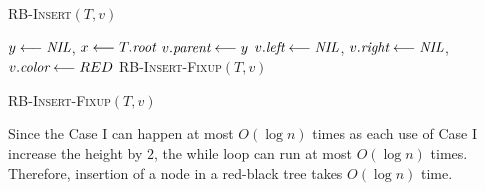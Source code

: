 \begin{minipage}{0.46\textwidth}
	\begin{algorithm}[H]
		\caption{\textsc{RB-Insert}$(T,v)$}
		\DontPrintSemicolon
		$y\longleftarrow \emph{NIL}$, $x\longleftarrow T.\emph{root}$\;
		$v.\emph{parent}\longleftarrow y$\;
		$v.\emph{left}\longleftarrow \emph{NIL}$,
		$v.\emph{right}\longleftarrow \emph{NIL}$, $v.\emph{color}\longleftarrow RED$\;
		\textsc{RB-Insert-Fixup}$(T,v)$\;
	\end{algorithm}
\end{minipage}\hfill
\begin{minipage}{0.5\textwidth}
	\begin{algorithm}[H]
		\caption{\textsc{RB-Insert-Fixup}$(T,v)$}
		\DontPrintSemicolon
	\end{algorithm}
\end{minipage}
\parinn

Since the Case I can happen at most $O(\log n)$ times as each use of Case I increase the height by $2$, the while loop can run at most $O(\log n)$ times. Therefore, insertion of a node in a red-black tree takes $O(\log n)$ time.
